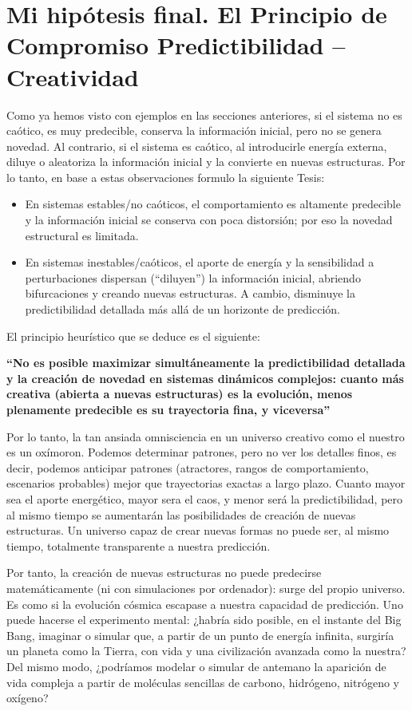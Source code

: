\documentclass[
  10pt,
  a4paper,
  DIV=11,
  numbers=noendperiod,
  open=any]{scrreprt}
\numberwithin{equation}{chapter}
\numberwithin{equation}{section}
\renewcommand{\[}{\begin{equation}}
\renewcommand{\]}{\end{equation}}
\begin{document}
\chapter{Mi hipótesis final. El Principio de Compromiso Predictibilidad
--
Creatividad}\label{mi-hipuxf3tesis-final.-el-principio-de-compromiso-predictibilidad-creatividad}

Como ya hemos visto con ejemplos en las secciones anteriores, si el
sistema no es caótico, es muy predecible, conserva la información
inicial, pero no se genera novedad. Al contrario, si el sistema es
caótico, al introducirle energía externa, diluye o aleatoriza la
información inicial y la convierte en nuevas estructuras. Por lo tanto,
en base a estas observaciones formulo la siguiente Tesis:

\begin{itemize}
\item
  En sistemas estables/no caóticos, el comportamiento es altamente
  predecible y la información inicial se conserva con poca distorsión;
  por eso la novedad estructural es limitada.
\item
  En sistemas inestables/caóticos, el aporte de energía y la
  sensibilidad a perturbaciones dispersan (``diluyen'') la información
  inicial, abriendo bifurcaciones y creando nuevas estructuras. A
  cambio, disminuye la predictibilidad detallada más allá de un
  horizonte de predicción.
\end{itemize}

El principio heurístico que se deduce es el siguiente:

\textbf{``No es posible maximizar simultáneamente la predictibilidad
detallada y la creación de novedad en sistemas dinámicos complejos:
cuanto más creativa (abierta a nuevas estructuras) es la evolución,
menos plenamente predecible es su trayectoria fina, y viceversa''}

Por lo tanto, la tan ansiada omnisciencia en un universo creativo como
el nuestro es un oxímoron. Podemos determinar patrones, pero no ver los
detalles finos, es decir, podemos anticipar patrones (atractores, rangos
de comportamiento, escenarios probables) mejor que trayectorias exactas
a largo plazo. Cuanto mayor sea el aporte energético, mayor sera el
caos, y menor será la predictibilidad, pero al mismo tiempo se
aumentarán las posibilidades de creación de nuevas estructuras. Un
universo capaz de crear nuevas formas no puede ser, al mismo tiempo,
totalmente transparente a nuestra predicción.

Por tanto, la creación de nuevas estructuras no puede predecirse
matemáticamente (ni con simulaciones por ordenador): surge del propio
universo. Es como si la evolución cósmica escapase a nuestra capacidad
de predicción. Uno puede hacerse el experimento mental: ¿habría sido
posible, en el instante del Big Bang, imaginar o simular que, a partir
de un punto de energía infinita, surgiría un planeta como la Tierra, con
vida y una civilización avanzada como la nuestra? Del mismo modo,
¿podríamos modelar o simular de antemano la aparición de vida compleja a
partir de moléculas sencillas de carbono, hidrógeno, nitrógeno y
oxígeno?
\end{document}
